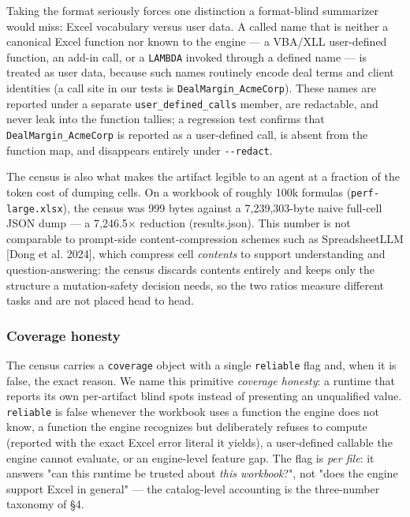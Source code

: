 \documentclass[
]{article}
\begin{document}
Taking the format seriously forces one distinction a format-blind
summarizer would miss: Excel vocabulary versus user data. A called name
that is neither a canonical Excel function nor known to the engine --- a
VBA/XLL user-defined function, an add-in call, or a \texttt{LAMBDA}
invoked through a defined name --- is treated as user data, because such
names routinely encode deal terms and client identities (a call site in
our tests is \texttt{DealMargin\_AcmeCorp}). These names are reported
under a separate \texttt{user\_defined\_calls} member, are redactable,
and never leak into the function tallies; a regression test confirms
that \texttt{DealMargin\_AcmeCorp} is reported as a user-defined call,
is absent from the function map, and disappears entirely under
\texttt{-\/-redact}.

The census is also what makes the artifact legible to an agent at a
fraction of the token cost of dumping cells. On a workbook of roughly
100k formulas (\texttt{perf-large.xlsx}), the census was 999 bytes
against a 7,239,303-byte naive full-cell JSON dump --- a 7,246.5×
reduction (results.json). This number is not comparable to prompt-side
content-compression schemes such as SpreadsheetLLM {[}Dong et al.
2024{]}, which compress cell \emph{contents} to support understanding
and question-answering: the census discards contents entirely and keeps
only the structure a mutation-safety decision needs, so the two ratios
measure different tasks and are not placed head to head.

\subsubsection{Coverage honesty}\label{coverage-honesty}

The census carries a \texttt{coverage} object with a single
\texttt{reliable} flag and, when it is false, the exact reason. We name
this primitive \emph{coverage honesty}: a runtime that reports its own
per-artifact blind spots instead of presenting an unqualified value.
\texttt{reliable} is false whenever the workbook uses a function the
engine does not know, a function the engine recognizes but deliberately
refuses to compute (reported with the exact Excel error literal it
yields), a user-defined callable the engine cannot evaluate, or an
engine-level feature gap. The flag is \emph{per file}: it answers "can
this runtime be trusted about \emph{this workbook}?", not "does the
engine support Excel in general" --- the catalog-level accounting is the
three-number taxonomy of §4.
\end{document}

